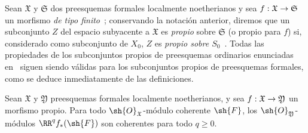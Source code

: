 \documentclass[oneside]{amsart}
\makeatletter
\renewcommand{\geq}{\geqslant}
\newcommand{\ega@arrow}[2]{\mathchoice{#1}{#2}{#2}{#2}}
\renewcommand{\to}{\ega@arrow{\longrightarrow}{\rightarrow}}
\let\EGAOriginalLabel\label
\renewcommand{\label}[1]{\phantomsection\EGAOriginalLabel{#1}}
\makeatother
\begin{document}
\begin{env}[3.4.1]
Sean $\mathfrak{X}$ y $\mathfrak{S}$ dos preesquemas formales localmente noetherianos y sea $f:\mathfrak{X}\to\mathfrak{S}$ un morfismo \emph{de tipo finito}~; conservando la notación anterior, diremos que un subconjunto $Z$ del espacio subyacente a $\mathfrak{X}$ es \emph{propio} sobre $\mathfrak{S}$ (o propio para $f$) si, considerado como subconjunto de $X_0$, $Z$ es \emph{propio sobre $S_0$}~.
Todas las propiedades de los subconjuntos propios de preesquemas ordinarios enunciadas en~ siguen siendo válidas para los subconjuntos propios de preesquemas formales, como se deduce inmediatamente de las definiciones.
\end{env}

\begin{theorem}[3.4.2]
\label{III.3.4.2}
Sean $\mathfrak{X}$ y $\mathfrak{Y}$ preesquemas formales localmente noetherianos, y sea $f:\mathfrak{X}\to\mathfrak{Y}$ un morfismo propio.
Para todo $\sh{O}_\mathfrak{X}$-módulo coherente $\sh{F}$, los $\sh{O}_\mathfrak{Y}$-módulos $\RR^q f_*(\sh{F})$ son coherentes para todo $q\geq 0$.
\end{theorem}
\end{document}
